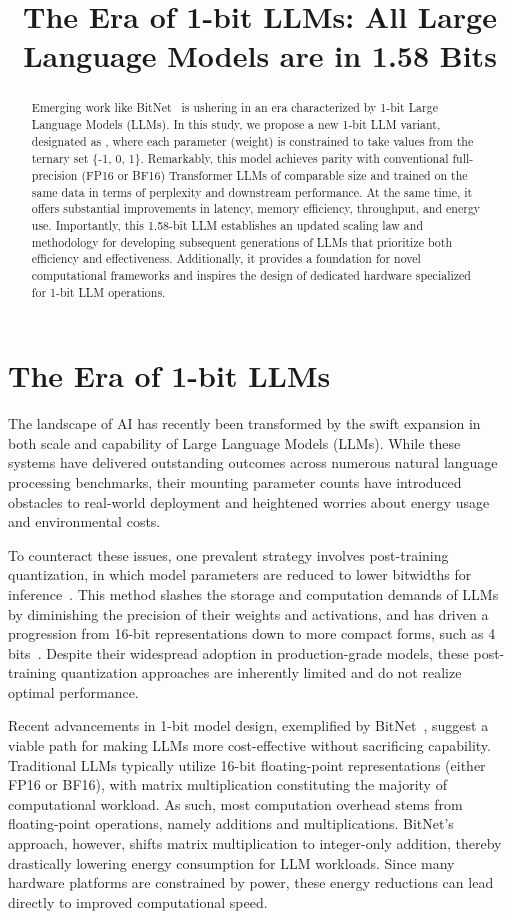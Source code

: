\title{The Era of 1-bit LLMs: All Large Language Models are in 1.58 Bits}

\begin{abstract}
Emerging work like BitNet~\cite{bitnet} is ushering in an era characterized by 1-bit Large Language Models (LLMs). In this study, we propose a new 1-bit LLM variant, designated as \textbf{}, where each parameter (weight) is constrained to take values from the ternary set \{-1, 0, 1\}. Remarkably, this model achieves parity with conventional full-precision (FP16 or BF16) Transformer LLMs of comparable size and trained on the same data in terms of perplexity and downstream performance. At the same time, it offers substantial improvements in latency, memory efficiency, throughput, and energy use. Importantly, this 1.58-bit LLM establishes an updated scaling law and methodology for developing subsequent generations of LLMs that prioritize both efficiency and effectiveness. Additionally, it provides a foundation for novel computational frameworks and inspires the design of dedicated hardware specialized for 1-bit LLM operations.
\end{abstract}

\section{The Era of 1-bit LLMs}

The landscape of AI has recently been transformed by the swift expansion in both scale and capability of Large Language Models (LLMs). While these systems have delivered outstanding outcomes across numerous natural language processing benchmarks, their mounting parameter counts have introduced obstacles to real-world deployment and heightened worries about energy usage and environmental costs.

To counteract these issues, one prevalent strategy involves post-training quantization, in which model parameters are reduced to lower bitwidths for inference~\cite{smoothquant, gptq, quip, quip_sharp}. This method slashes the storage and computation demands of LLMs by diminishing the precision of their weights and activations, and has driven a progression from 16-bit representations down to more compact forms, such as 4 bits~\cite{gptq, awq}. Despite their widespread adoption in production-grade models, these post-training quantization approaches are inherently limited and do not realize optimal performance.

Recent advancements in 1-bit model design, exemplified by BitNet~\cite{bitnet}, suggest a viable path for making LLMs more cost-effective without sacrificing capability. Traditional LLMs typically utilize 16-bit floating-point representations (either FP16 or BF16), with matrix multiplication constituting the majority of computational workload. As such, most computation overhead stems from floating-point operations, namely additions and multiplications. BitNet’s approach, however, shifts matrix multiplication to integer-only addition, thereby drastically lowering energy consumption for LLM workloads. Since many hardware platforms are constrained by power, these energy reductions can lead directly to improved computational speed.

